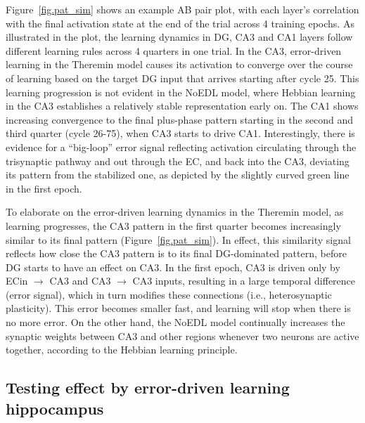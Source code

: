 \documentclass[11pt,twoside]{article}
\newif\myifpdf
\begin{document}
Figure~\ref{fig.pat_sim} shows an example AB pair plot, with each layer's correlation with the final activation state at the end of the trial across 4 training epochs.  As illustrated in the plot, the learning dynamics in DG, CA3 and CA1 layers follow different learning rules across 4 quarters in one trial.  In the CA3, error-driven learning in the Theremin model causes its activation to converge over the course of learning based on the target DG input that arrives starting after cycle 25.  This learning progression is not evident in the NoEDL model, where Hebbian learning in the CA3 establishes a relatively stable representation early on.  The CA1 shows increasing convergence to the final plus-phase pattern starting in the second and third quarter (cycle 26-75), when CA3 starts to drive CA1.  Interestingly, there is evidence for a ``big-loop'' error signal \citep{KumaranMcClelland12} reflecting activation circulating through the trisynaptic pathway and out through the EC, and back into the  CA3, deviating its pattern from the stabilized one, as depicted by the slightly curved green line in the first epoch.

To elaborate on the error-driven learning dynamics in the Theremin model, as learning progresses, the CA3 pattern in the first quarter becomes increasingly similar to its final pattern (Figure~\ref{fig.pat_sim}). In effect, this similarity signal reflects how close the CA3 pattern is to its final DG-dominated pattern, before DG starts to have an effect on CA3. In the first epoch, CA3 is driven only by ECin $\rightarrow$ CA3 and CA3 $\rightarrow$ CA3 inputs, resulting in a large temporal difference (error signal), which in turn modifies these connections (i.e., heterosynaptic plasticity). This error becomes smaller fast, and learning will stop when there is no more error.  On the other hand, the NoEDL model continually increases the synaptic weights between CA3 and other regions whenever two neurons are active together, according to the Hebbian learning principle.

\subsection{Testing effect by error-driven learning hippocampus}
\end{document}
